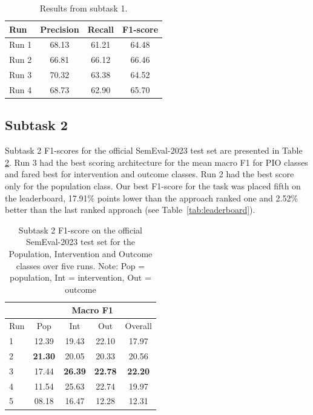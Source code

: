 \documentclass[11pt]{article}
\begin{document}
\begin{table}[ht]
    \centering
    \begin{tabular}{lccc}
        \toprule
        Run & Precision & Recall & F1-score \\
        \midrule
        Run 1 & 68.13 & 61.21 & 64.48 \\
        Run 2 & 66.81 & 66.12 & 66.46 \\
        Run 3 & 70.32 & 63.38 & 64.52 \\
        Run 4 & 68.73 & 62.90 & 65.70 \\
        \bottomrule
    \end{tabular}
    \caption{Results from subtask 1.}
    \label{tab:task_1}
\end{table}
%
%
%
\subsection{Subtask 2}
\label{res:task2}
%
Subtask 2 F1-scores for the official SemEval-2023 test set are presented in Table \ref{tab:task_2}.
Run 3 had the best scoring architecture for the mean macro F1 for PIO classes and fared best for intervention and outcome classes.
Run 2 had the best score only for the population class.
Our best F1-score for the task was placed fifth on the leaderboard, 17.91\% points lower than the approach ranked one and 2.52\% better than the last ranked approach (see Table~\ref{tab:leaderboard}).
%
\begin{table}[ht]
    \centering
    \begin{tabular}{lcccc}
        \toprule
          & \multicolumn{4}{c}{Macro F1} \\
         \hline
        Run & Pop & Int & Out & Overall \\
        \midrule
        1 & 12.39 & 19.43 & 22.10 & 17.97 \\
        2 & \textbf{21.30} & 20.05 & 20.33 & 20.56  \\
        3 & 17.44 & \textbf{26.39} & \textbf{22.78} & \textbf{22.20} \\
        4 & 11.54 & 25.63 & 22.74 & 19.97 \\
        5 & 08.18 & 16.47 & 12.28 & 12.31 \\
        \bottomrule
    \end{tabular}
    \caption{Subtask 2 F1-score on the official SemEval-2023 test set for the Population, Intervention and Outcome classes over five runs. Note: Pop = population, Int = intervention, Out = outcome}
    \label{tab:task_2}
\end{table}
\end{document}
